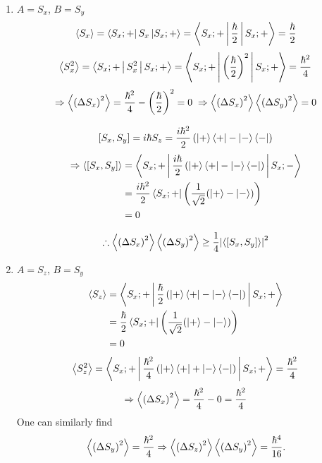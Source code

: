 \item

\begin{enumerate}[labelindent = 0pt, label = (\roman*)]
	\item $A = S_x$, $B = S_y$
	\[
		\Braket{S_x}
		= \Bra{S_{x}; +} S_x \Ket{S_{x}; +}
		= \Braket{S_x; + | \frac{\hbar}{2} | S_x; +}
		= \frac{\hbar}{2}
	\]
	\[
		\Braket{S_x^2}
		= \Braket{S_x; + | S_x^2 | S_x; +}
		= \Braket{S_x; + | {\left( \frac{\hbar}{2} \right)}^2 | S_x; +}
		= \frac{\hbar^2}{4}
	\]
	\[
		\Rightarrow \Braket{{\left( \Delta S_x \right)}^2}
		= \frac{\hbar^2}{4} - {\left( \frac{\hbar}{2} \right)}^2
		= 0
		\; \Rightarrow
		\Braket{{\left( \Delta S_x \right)}^2} \Braket{{\left( \Delta S_y \right)}^2} = 0
	\]

	\vspace{10pt}

	\[
		\left[ S_x, S_y \right]
		= i\hbar S_z
		= \frac{i\hbar^2}{2} \left( \Ket{+}\Bra{+} - \Ket{-}\Bra{-} \right)
	\]
	\begin{align*}
		\Rightarrow
		\Braket{\left[ S_x, S_y \right]}
		&= \Braket{S_x; + | \frac{i\hbar}{2} \left( \Ket{+}\Bra{+} - \Ket{-}\Bra{-} \right) | S_x; -} \\
		&= \frac{i\hbar^2}{2}\Bra{S_{x}; +}\left( \frac{1}{\sqrt{2}} (\Ket{+} - \Ket{-}) \right) \\
		&= 0
	\end{align*}

	\[
		\therefore
		\Braket{{\left( \Delta S_x \right)}^2} \Braket{{\left( \Delta S_y \right)}^2}
		\geq \frac{1}{4} {\left| \Braket{\left[ S_x, S_y \right]} \right|}^2
	\]


	\item $A = S_z$, $B = S_y$
	\begin{align*}
		\Braket{S_z}
		&= \Braket{S_x; + | \frac{\hbar}{2} \left( \Ket{+}\Bra{+} - \Ket{-}\Bra{-} \right) | S_x; +} \\
		&= \frac{\hbar}{2} \Bra{S_{x}; +}\left( \frac{1}{\sqrt{2}} (\Ket{+} - \Ket{-}) \right) \\
		&= 0
	\end{align*}
	\[
		\Braket{S_z^2}
		= \Braket{S_x; + | \frac{\hbar^2}{4} \left( \Ket{+}\Bra{+} + \Ket{-}\Bra{-} \right) | S_x; +}
		= \frac{\hbar^2}{4}
	\]
	\[
		\Rightarrow \Braket{{\left( \Delta S_x \right)}^2}
		= \frac{\hbar^2}{4} - 0
		= \frac{\hbar^2}{4}
	\]
	One can similarly find
	\[
		\Braket{{\left( \Delta S_y \right)}^2} = \frac{\hbar^2}{4}
		\Rightarrow
		\Braket{{\left( \Delta S_z \right)}^2} \Braket{{\left( \Delta S_y \right)}^2}
		= \frac{\hbar^4}{16}.
	\]


\end{enumerate}

